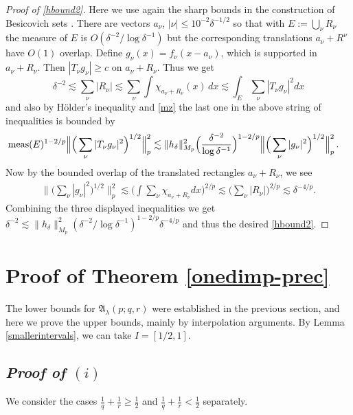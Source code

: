 \documentclass[11pt]{amsart}
\theoremstyle{definition}
\numberwithin{theorem}{section}
\numberwithin{definition}{section}
\numberwithin{equation}{section}
\renewcommand{\le}{\leqslant}
\renewcommand{\ge}{\geqslant}
\def\meas{{\text{\rm meas}}}
\def\lc{\lesssim}
\def\la{\lambda}             \def\La{\Lambda}
\def\fA{{\mathfrak {A}}}
\renewcommand{\le}{\leqslant}
\renewcommand{\ge}{\geqslant}
\begin{document}
\begin{proof}[Proof of \eqref{hbound2}]
Here we use again  the sharp bounds in the construction
of   Besicovich sets  \cite{keich}.
There are vectors $a_\nu$, $|\nu|\le 10^{-2}\delta^{-1/2} $ so that
with
$E:=  \bigcup_\nu R_\nu$ the measure of $E$ is
$O(\delta^{-2}/\log\delta^{-1})$
but
the corresponding translations $a_\nu+ R^\nu$ have $O(1)$ overlap.
Define $g_\nu(x)= f_\nu(x-a_\nu)$, which is supported in $a_\nu+ R_\nu$. Then $|T_\nu g_\nu|\ge c$ on
$a_\nu+R_\nu$.
Thus we get
$$
\delta^{-2} \lc \sum_\nu|R_\nu| \lc \sum_\nu\int \chi_{a_\nu+R_\nu}(x)\, dx
\lc \int_E \sum_\nu|T_\nu g_\nu|^2dx
$$ and also by H\"older's inequality  and \eqref{mz}
the last one in the above string of  inequalities is bounded by
\begin{align*}
\meas(E)^{1-2/p} \Big\|\Big(\sum_\nu|T_\nu g_\nu|^2\Big)^{1/2}\Big\|_p^2
&\lc \|h_\delta\|_{M_p} ^2\Big(\frac{\delta^{-2}}{\log\delta^{-1}}\Big)^{1-2/p}
\Big\|\Big(\sum_\nu| g_\nu|^2\Big)^{1/2}\Big\|_p^2\,.
\end{align*}
Now by  the bounded overlap of the  translated  rectangles
$a_\nu+ R_\nu$, we see
\begin{align*}
\Big\|\Big(\sum_\nu| g_\nu|^2\Big)^{1/2}\Big\|_p^2
\lc \Big(\int\sum_\nu\chi_{a_\nu+R_\nu}dx\Big)^{2/p}
\lc \Big(\sum_\nu|R_\nu|\Big)^{2/p} \lc\delta^{-4/p}.
\end{align*}
Combining the three displayed inequalities we get
$\delta^{-2}\lc \|h_\delta\|_{M_p} ^2 (\delta^{-2}/\log\delta^{-1})^{1-2/p}\delta^{-4/p}$
and thus the desired \eqref{hbound2}.
\end{proof}



\section{Proof of Theorem \ref{onedimp-prec}}\label{d=1}
The lower bounds for $\fA_\la(p;q,r)$ were established in the previous section, and here we prove the upper bounds, mainly by interpolation arguments. By Lemma \ref{smallerintervals}, we can take $I=[1/2,1]$.

\subsection{\it Proof of $(i)$} We consider the cases $\frac1q+\frac1r\ge \frac12$ and $\frac1q+\frac1r< \frac12$ separately.
\end{document}
